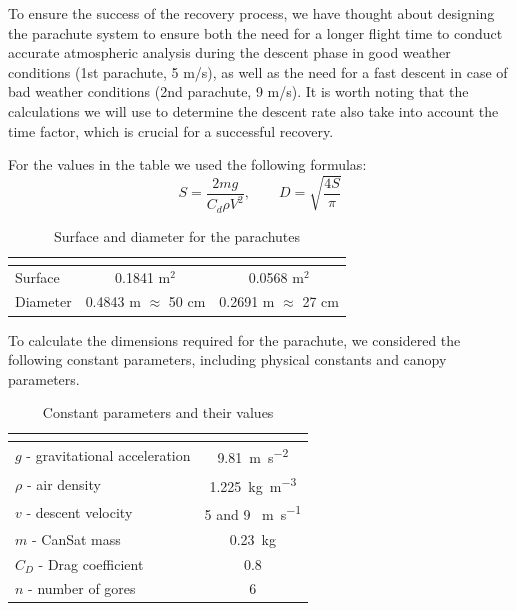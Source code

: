 To ensure the success of the recovery process, we have thought about designing the parachute system to ensure both the need for a longer flight time to conduct accurate atmospheric analysis during the descent phase in good weather conditions (1st parachute, 5 m/s), as well as the need for a fast descent in case of bad weather conditions (2nd parachute, 9 m/s). It is worth noting that the calculations we will use to determine the descent rate also take into account the time factor, which is crucial for a successful recovery.

For the values in the table we used the following formulas:
\begin{equation}\label{eq1}
S=\frac{2mg}{C_d \rho V^2}, \quad\quad D = \sqrt{\frac{4S}{\pi}}
\end{equation}

\begin{table}[htbp]
\centering
{}
\begin{tabular}{>{\centering\arraybackslash}lcc}
\rowcolor{DeepSkyBlue4}
\hline
\textbf{\color{white!50}{Parameter}} & \multicolumn{1}{|c|}{\textbf{\color{white!50}{1st Parachute}}}  & \textbf{\color{white!50}{2nd Parachute}} \\
\hline
Surface & 0.1841 m$^{2}$ & 0.0568 m$^{2}$\\
Diameter & 0.4843 m $\approx$ 50 cm & 0.2691 m $\approx$ 27 cm \\
\hline
\end{tabular}
\caption{Surface and diameter for the parachutes}
\end{table}


To calculate the dimensions required for the parachute, we considered the following constant parameters, including physical constants and canopy parameters.

\begin{table}[htbp]
\centering
{}
\begin{tabular}{>{\centering\arraybackslash}lc}
\rowcolor{DeepSkyBlue4}
\hline
\multicolumn{1}{|c|}{\textbf{\color{white!50}{Parameter}}}  & \textbf{\color{white!50}{Value}} \\
\hline
$g$ - gravitational acceleration & \SI{9.81 }{\meter\per\square\second} \\
\rowcolor{LightCyan1!50}$\rho$ - air density & \SI{1.225}{\kilogram\per\cubic\metre} \\
$v$ - descent velocity & 5 and 9 \SI{}{\meter\per\second} \\
\rowcolor{LightCyan1!50}$m$ - CanSat mass & \SI{0.23}{\kilogram} \\
$C_D$ - Drag coefficient & 0.8 \\
\rowcolor{LightCyan1!50}$n$ - number of gores & 6 \\
\hline
\end{tabular}
\caption{Constant parameters and their values}
\end{table}


